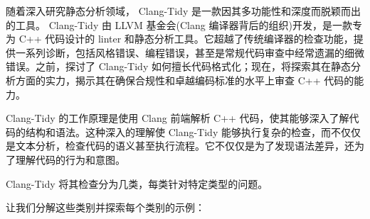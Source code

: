 
随着深入研究静态分析领域， Clang-Tidy 是一款因其多功能性和深度而脱颖而出的工具。 Clang-Tidy 由 LLVM 基金会(Clang 编译器背后的组织)开发，是一款专为 C++ 代码设计的 linter 和静态分析工具。它超越了传统编译器的检查功能，提供一系列诊断，包括风格错误、编程错误，甚至是常规代码审查中经常遗漏的细微错误。之前，探讨了 Clang-Tidy 如何擅长代码格式化；现在，将探索其在静态分析方面的实力，揭示其在确保合规性和卓越编码标准的水平上审查 C++ 代码的能力。

Clang-Tidy 的工作原理是使用 Clang 前端解析 C++ 代码，使其能够深入了解代码的结构和语法。这种深入的理解使 Clang-Tidy 能够执行复杂的检查，而不仅仅是文本分析，检查代码的语义甚至执行流程。它不仅仅是为了发现语法差异，还为了理解代码的行为和意图。


Clang-Tidy 将其检查分为几类，每类针对特定类型的问题。

让我们分解这些类别并探索每个类别的示例：

